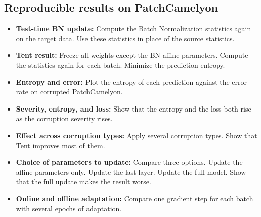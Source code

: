 \documentclass[11pt]{article}
\begin{document}
\subsection*{Reproducible results on PatchCamelyon}
\begin{itemize}
  \item \textbf{Test-time BN update:} Compute the Batch Normalization statistics
        again on the target data. Use these statistics in place of the source
        statistics.
  \item \textbf{Tent result:} Freeze all weights except the BN affine
        parameters. Compute the statistics again for each batch. Minimize the
        prediction entropy.
  \item \textbf{Entropy and error:} Plot the entropy of each prediction against
        the error rate on corrupted PatchCamelyon.
  \item \textbf{Severity, entropy, and loss:} Show that the entropy and the loss
        both rise as the corruption severity rises.
  \item \textbf{Effect across corruption types:} Apply several corruption types.
        Show that Tent improves most of them.
  \item \textbf{Choice of parameters to update:} Compare three options. Update
        the affine parameters only. Update the last layer. Update the full model.
        Show that the full update makes the result worse.
  \item \textbf{Online and offline adaptation:} Compare one gradient step for
        each batch with several epochs of adaptation.
\end{itemize}
\end{document}

